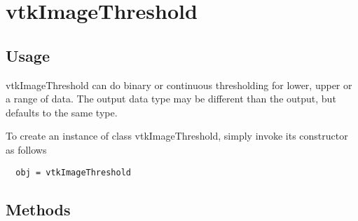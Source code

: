 \section{vtkImageThreshold}

\subsection{Usage}

 vtkImageThreshold can do binary or continuous thresholding for lower, upper
 or a range of data.  The output data type may be different than the
 output, but defaults to the same type.

To create an instance of class vtkImageThreshold, simply
invoke its constructor as follows
\begin{verbatim}
  obj = vtkImageThreshold
\end{verbatim}
\subsection{Methods}


